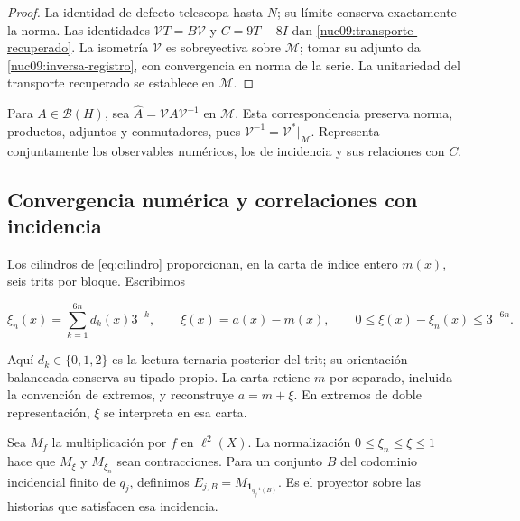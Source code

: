 \begin{proof}
La identidad de defecto telescopa hasta \(N\); su límite conserva
exactamente la norma. Las identidades
\(\mathcal VT=B\mathcal V\) y \(C=9T-8I\) dan
\eqref{nuc09:transporte-recuperado}.
La isometría \(\mathcal V\) es sobreyectiva sobre \(\mathcal M\);
tomar su adjunto da \eqref{nuc09:inversa-registro}, con convergencia
en norma de la serie. La unitariedad del transporte recuperado
se establece en \(\mathcal M\).
\end{proof}

Para \(A\in\mathcal B(H)\), sea
\(\widehat A=\mathcal VA\mathcal V^{-1}\) en \(\mathcal M\).
Esta correspondencia preserva norma, productos, adjuntos y conmutadores,
pues \(\mathcal V^{-1}=\mathcal V^*|_{\mathcal M}\).
Representa conjuntamente los observables numéricos, los de incidencia
y sus relaciones con \(C\).

\subsection{Convergencia numérica y correlaciones con incidencia}

Los cilindros de \eqref{eq:cilindro} proporcionan, en la carta de
índice entero \(m(x)\), seis trits por bloque. Escribimos



\[
\xi_n(x)=\sum_{k=1}^{6n}d_k(x)3^{-k},\qquad
\xi(x)=a(x)-m(x),\qquad 0\le\xi(x)-\xi_n(x)\le3^{-6n}.
\]



Aquí \(d_k\in\{0,1,2\}\) es la lectura ternaria posterior del trit;
su orientación balanceada conserva su tipado propio. La carta
retiene \(m\) por separado, incluida la convención de extremos,
y reconstruye \(a=m+\xi\). En extremos de doble representación,
\(\xi\) se interpreta en esa carta.

Sea \(M_f\) la multiplicación por \(f\) en \(\ell^2(X)\).
La normalización \(0\le\xi_n\le\xi\le1\) hace que
\(M_\xi\) y \(M_{\xi_n}\) sean contracciones.
Para un conjunto \(B\) del codominio incidencial finito de \(q_j\),
definimos
\(E_{j,B}=M_{\mathbf1_{q_j^{-1}(B)}}\).
Es el proyector sobre las historias que satisfacen esa incidencia.

